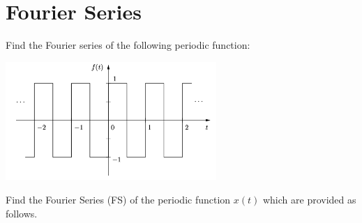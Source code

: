 \documentclass[a4paper, 10pt]{article}
\begin{document}
\subject[2110203 - Computer Engineering Mathematics II]


\section{Fourier Series}



\begin{problem}
Find the Fourier series of the following periodic function:

\begin{center}
    \includegraphics[width=0.6\textwidth]{images/problem_1_reference.png}
\end{center}
\end{problem}

\begin{solution}

\end{solution}

\newpage

\begin{problem}
Find the Fourier Series (FS) of the periodic function \( x(t) \) which are provided as follows.
\end{problem}
\end{document}
